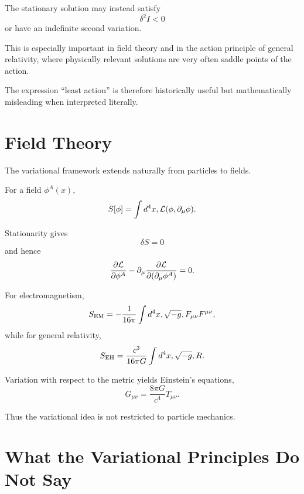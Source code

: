 The stationary solution may instead satisfy
\begin{equation}
\delta^2 I<0
\end{equation}
or have an indefinite second variation.

This is especially important in field theory and in the action principle of general relativity, where physically relevant solutions are very often saddle points of the action.

The expression ``least action'' is therefore historically useful but mathematically misleading when interpreted literally.

\section{Field Theory}

The variational framework extends naturally from particles to fields.

For a field $\phi^A(x)$,
\begin{equation}
S[\phi]
=
\int d^4x,{\cal L}
(\phi,\partial_\mu\phi).
\end{equation}

Stationarity gives
\begin{equation}
\delta S=0
\end{equation}
and hence
\begin{equation}
\frac{\partial{\cal L}}{\partial\phi^A}
-
\partial_\mu
\frac{\partial{\cal L}}
{\partial(\partial_\mu\phi^A)}
=0.
\end{equation}

For electromagnetism,
\begin{equation}
S_{\rm EM}
=
-\frac{1}{16\pi}
\int d^4x,\sqrt{-g},
F_{\mu\nu}F^{\mu\nu},
\end{equation}
while for general relativity,
\begin{equation}
S_{\rm EH}
=
\frac{c^3}{16\pi G}
\int d^4x,\sqrt{-g},R.
\end{equation}

Variation with respect to the metric yields Einstein's equations,
\begin{equation}
G_{\mu\nu}
=
\frac{8\pi G}{c^4}T_{\mu\nu}.
\end{equation}

Thus the variational idea is not restricted to particle mechanics.

\section{What the Variational Principles Do Not Say}

